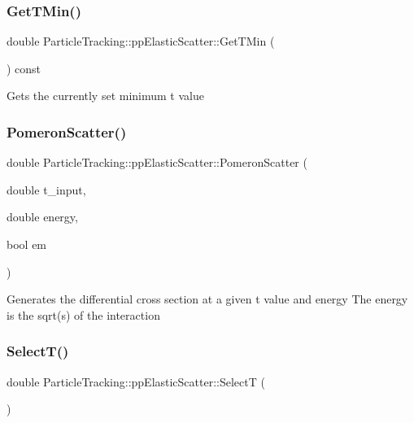 \subsubsection{\texorpdfstring{Get\+T\+Min()}{GetTMin()}}
{\footnotesize\ttfamily double Particle\+Tracking\+::pp\+Elastic\+Scatter\+::\+Get\+T\+Min (\begin{DoxyParamCaption}{ }\end{DoxyParamCaption}) const}

Gets the currently set minimum t value \mbox{\label{classParticleTracking_1_1ppElasticScatter_a86e3e9ad3f0d852e1e2244be5db49547}} 
\subsubsection{\texorpdfstring{Pomeron\+Scatter()}{PomeronScatter()}}
{\footnotesize\ttfamily double Particle\+Tracking\+::pp\+Elastic\+Scatter\+::\+Pomeron\+Scatter (\begin{DoxyParamCaption}\item[{double}]{t\+\_\+input,  }\item[{double}]{energy,  }\item[{bool}]{em }\end{DoxyParamCaption})}

Generates the differential cross section at a given t value and energy The energy is the sqrt(s) of the interaction \mbox{\label{classParticleTracking_1_1ppElasticScatter_a7ca2a62dcdda44c0164cd0f4123bb140}} 
\subsubsection{\texorpdfstring{Select\+T()}{SelectT()}}
{\footnotesize\ttfamily double Particle\+Tracking\+::pp\+Elastic\+Scatter\+::\+SelectT (\begin{DoxyParamCaption}{ }\end{DoxyParamCaption})}

